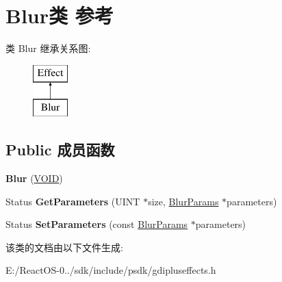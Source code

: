 \hypertarget{class_blur}{}\section{Blur类 参考}
\label{class_blur}
类 Blur 继承关系图\+:\begin{figure}[H]
\begin{center}
\leavevmode
\includegraphics[height=2.000000cm]{class_blur}
\end{center}
\end{figure}
\subsection*{Public 成员函数}
\begin{DoxyCompactItemize}
\item 
\mbox{\label{class_blur_a8c6574fc8fceec2ee5d122e0268b21cd}} 
{\bfseries Blur} (\hyperlink{interfacevoid}{V\+O\+ID})
\item 
\mbox{\label{class_blur_a90998fbdab387b1a4631e075efd0a384}} 
Status {\bfseries Get\+Parameters} (U\+I\+NT $\ast$size, \hyperlink{struct_blur_params}{Blur\+Params} $\ast$parameters)
\item 
\mbox{\label{class_blur_a3aa3e1d1bcacbaa33c43ef3e9c560cef}} 
Status {\bfseries Set\+Parameters} (const \hyperlink{struct_blur_params}{Blur\+Params} $\ast$parameters)
\end{DoxyCompactItemize}


该类的文档由以下文件生成\+:\begin{DoxyCompactItemize}
\item 
E\+:/\+React\+O\+S-\/0../sdk/include/psdk/gdipluseffects.\+h\end{DoxyCompactItemize}
